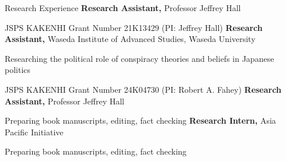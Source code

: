 \begin{rubric}{Research Experience}
\entry*[2025/05 -- \ldots]%
\textbf{Research Assistant,} Professor Jeffrey Hall
\par \small JSPS KAKENHI Grant Number 21K13429 (PI: Jeffrey Hall)
%
%
%
\entry*[2023/09 -- 2025/03]%
\textbf{Research Assistant,} Waseda Institute of Advanced Studies, Waseda University
        \par \small Researching the political role of conspiracy theories and beliefs in Japanese politics
        \par \small JSPS KAKENHI Grant Number 24K04730 (PI: Robert A. Fahey)
\entry*[2020/09 -- 2020/10]%
\textbf{Research Assistant,} Professor Jeffrey Hall
\par \small Preparing book manuscripts, editing, fact checking
 \entry*[2020/04 -- 2020/06]%
 \textbf{Research Intern,} Asia Pacific Initiative
        \par \small  Preparing book manuscripts, editing, fact checking
 \end{rubric}
